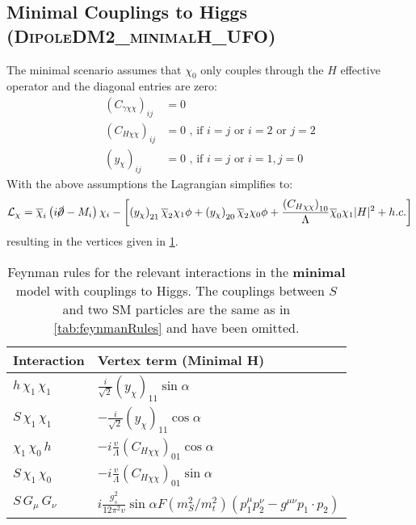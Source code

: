 \documentclass[a4paper,11pt]{article}
\begin{document}
\newpage
\clearpage
\subsection{Minimal Couplings to Higgs (\textsc{\small DipoleDM2\_minimalH\_UFO})}

The minimal scenario assumes that $\chi_0$ only couples through the $H$ effective operator and the diagonal entries are zero:
\begin{align}
	(C_{\gamma\chi\chi})_{ij} &= 0\\
	(C_{H\chi\chi})_{ij} &= 0 \mbox{ , if $i = j$ or $i = 2$ or $j=2$} \\
	(y_{\chi})_{ij} & = 0 \mbox{ , if $i = j$ or $i =1, j = 0$ }
\end{align}
With the above assumptions the Lagrangian simplifies to:
\begin{align}
	\mathcal{L}_{\chi} = \overline{\chi}_i \left( i \cancel \partial- M_{i} \right) \chi_i - \left[\left(y_\chi\right)_{21} \overline{\chi}_2 \chi_1 \phi + \left(y_\chi\right)_{20} \overline{\chi}_2 \chi_0 \phi + \frac{\left(C_{H \chi \chi}\right)_{10}}{\Lambda} \overline{\chi}_0 \chi_1 |H|^2  + h.c.\right] 
\end{align}
resulting in the vertices given in \cref{tab:feynmanRulesH}.

\begin{table}[h!]   \centering
	\vspace{0.2cm}
	\begin{tabular}{p{2cm}|p{8.5cm}}
		\toprule
		\textbf{Interaction} & \textbf{Vertex term (Minimal H)}\\ \toprule 
		$h\, \chi_1\,\chi_1$ & $\frac{i}{\sqrt{2}} (y_{\chi})_{11} \sin\alpha$\\
		$S\,\chi_1\,\chi_1$  & $-\frac{i}{\sqrt{2}} (y_{\chi})_{11} \cos\alpha $\\
		$\chi_1\,\chi_0\,h$  & $-i \frac{v}{\Lambda} (C_{H\chi\chi})_{01} \cos\alpha$\\
		$S\,\chi_1\,\chi_0$ &  $-i \frac{v}{\Lambda} (C_{H\chi\chi})_{01} \sin\alpha$\\
    	$S\,G_\mu\,G_\nu$  & $i \frac{g_s^2}{12 \pi^2 v} \sin\alpha F(m^2_S/m^2_t) (p_1^\mu p_2^\nu - g^{\mu\nu} p_1\cdot p_2) $\\
		\bottomrule        
	\end{tabular}
	\caption{Feynman rules for the relevant interactions in the {\bf minimal} model with couplings to Higgs. The couplings between $S$ and two SM particles are the same as in \cref{tab:feynmanRules} and have been omitted. \label{tab:feynmanRulesH}}
\end{table}
\end{document}

